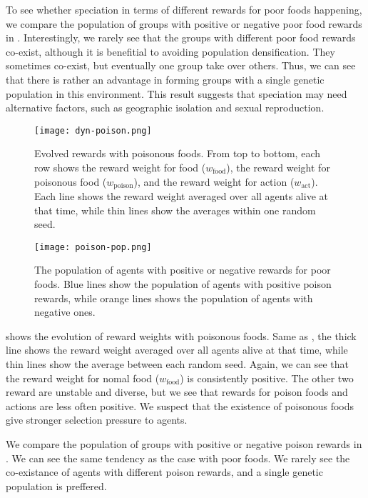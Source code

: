 To see whether speciation in terms of different rewards for poor foods happening, we compare the population of groups with positive or negative poor food rewards in .
Interestingly, we rarely see that the groups with different poor food rewards co-exist, although it is benefitial to avoiding population densification. They sometimes co-exist, but eventually one group take over others. Thus, we can see that there is rather an advantage in forming groups with a single genetic population in this environment. This result suggests that speciation may need alternative factors, such as geographic isolation and sexual reproduction.

\begin{figure}[t]
  \centering
  \texttt{[image: dyn-poison.png]}
  \caption{
    Evolved rewards with poisonous foods.
    From top to bottom, each row shows the reward weight for food ($w_{\mathrm{food}}$), the reward weight for poisonous food ($w_{\mathrm{poison}}$), and the reward weight for action ($w_{\mathrm{act}}$).
    Each line shows the reward weight averaged over all agents alive at that time, while thin lines show the averages within one random seed.
  }\label{figure:result-poison}
\end{figure}

\begin{figure}[t]
  \centering
  \texttt{[image: poison-pop.png]}
  \caption{
    The population of agents with positive or negative rewards for poor foods.
    Blue lines show the population of agents with positive poison rewards, while orange lines shows the population of agents with negative ones.
  }\label{figure:pop-poison}
\end{figure}


 shows the evolution of reward weights with poisonous foods. Same as , the thick line shows the reward weight averaged over all agents alive at that time, while thin lines show the average between each random seed. Again, we can see that the reward weight for nomal food ($w_{\mathrm{food}}$) is consistently positive. The other two reward are unstable and diverse, but we see that rewards for poison foods and actions are less often positive. We suspect that the existence of poisonous foods give stronger selection pressure to agents.

We compare the population of groups with positive or negative poison rewards in . We can see the same tendency as the case with poor foods. We rarely see the co-existance of agents with different poison rewards, and a single genetic population is preffered.

